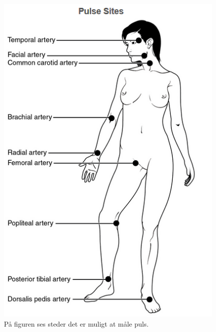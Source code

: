 \begin{figure}[H]
	\centering
	\includegraphics[scale=0.6]{figures/bProblemloesning/puls.png}
	\caption{På figuren ses steder det er muligt at måle puls.\citep{CNX2016}}
	\label{fig:sensor_placering}
	\end{figure}
